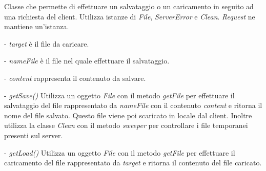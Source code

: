 Classe che permette di effettuare un salvataggio o un caricamento in seguito ad una richiesta del client.
Utilizza istanze di \textit{File}, \textit{ServerError} e \textit{Clean}.
\textit{Request} ne mantiene un'istanza.
\begin{elencopuntato}[\subsubsecindent]
\item[-] \textit{target} \`e il file da caricare.
\item[-] \textit{nameFile} \`e il file nel quale effettuare il salvataggio.
\item[-] \textit{content} rappresenta il contenuto da salvare.
\end{elencopuntato}
\begin{elencopuntato}[\subsubsecindent]
\item[-] \textit{getSave()} Utilizza un oggetto \textit{File} con il metodo \textit{getFile} per effettuare il salvataggio del file rappresentato da \textit{nameFile} con il contenuto \textit{content} e ritorna il nome del file salvato. Questo file viene poi scaricato in locale dal client. Inoltre utilizza la classe \textit{Clean} con il metodo \textit{sweeper} per controllare i file temporanei presenti sul server.
\item[-] \textit{getLoad()} Utilizza un oggetto \textit{File} con il metodo \textit{getFile} per effettuare il caricamento del file rappresentato da \textit{target} e ritorna il contenuto del file caricato.
\end{elencopuntato}



